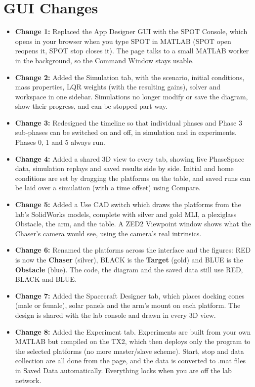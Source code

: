 \documentclass[11pt]{article}
\begin{document}
\section*{\textcolor{primaryColor}{GUI Changes}}
\begin{itemize}[label={\textcolor{primaryColor}{\textbullet}}]
    \item \textbf{Change 1:} Replaced the App Designer GUI with the SPOT Console, which opens in your browser when you type SPOT in MATLAB (SPOT open reopens it, SPOT stop closes it). The page talks to a small MATLAB worker in the background, so the Command Window stays usable.
    \item \textbf{Change 2:} Added the Simulation tab, with the scenario, initial conditions, mass properties, LQR weights (with the resulting gains), solver and workspace in one sidebar. Simulations no longer modify or save the diagram, show their progress, and can be stopped part-way.
    \item \textbf{Change 3:} Redesigned the timeline so that individual phases and Phase 3 sub-phases can be switched on and off, in simulation and in experiments. Phases 0, 1 and 5 always run.
    \item \textbf{Change 4:} Added a shared 3D view to every tab, showing live PhaseSpace data, simulation replays and saved results side by side. Initial and home conditions are set by dragging the platforms on the table, and saved runs can be laid over a simulation (with a time offset) using Compare.
    \item \textbf{Change 5:} Added a Use CAD switch which draws the platforms from the lab's SolidWorks models, complete with silver and gold MLI, a plexiglass Obstacle, the arm, and the table. A ZED2 Viewpoint window shows what the Chaser's camera would see, using the camera's real intrinsics.
    \item \textbf{Change 6:} Renamed the platforms across the interface and the figures: RED is now the \textbf{Chaser} (silver), BLACK is the \textbf{Target} (gold) and BLUE is the \textbf{Obstacle} (blue). The code, the diagram and the saved data still use RED, BLACK and BLUE.
    \item \textbf{Change 7:} Added the Spacecraft Designer tab, which places docking cones (male or female), solar panels and the arm's mount on each platform. The design is shared with the lab console and drawn in every 3D view.
    \item \textbf{Change 8:} Added the Experiment tab. Experiments are built from your own MATLAB but compiled on the TX2, which then deploys only the program to the selected platforms (no more master/slave scheme). Start, stop and data collection are all done from the page, and the data is converted to .mat files in Saved Data automatically. Everything locks when you are off the lab network.

\end{itemize}
\end{document}
